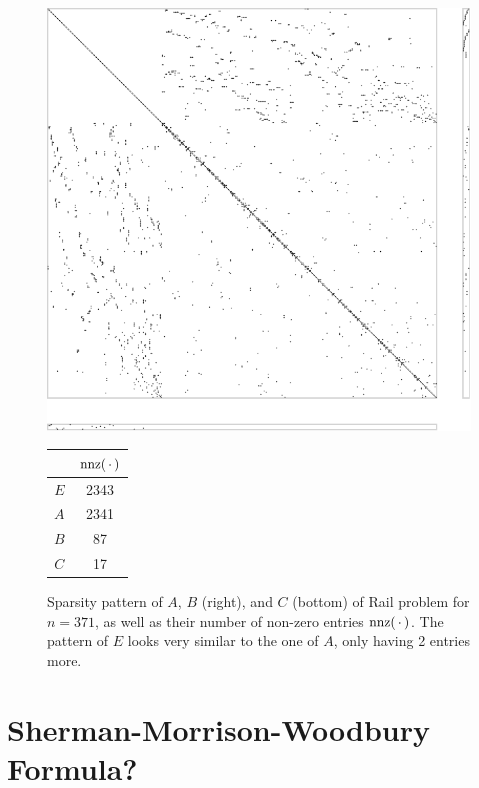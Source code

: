 \begin{figure}[t]
  \centering
  \begin{minipage}[c]{0.5\textwidth}
    \includegraphics[width=\textwidth]{figures/spy_ABC.pdf}
  \end{minipage}
  \begin{minipage}[c]{0.25\textwidth}
    \flushright
    \begin{tabular}{cS[table-format=4.0]}
      \toprule
      & {$\nnz(\optional{})$} \\
      \midrule
      $E$ & 2343 \\
      $A$ & 2341 \\
      $B$ & 87 \\
      $C$ & 17 \\
      \bottomrule
    \end{tabular}
  \end{minipage}
  \caption[Sparsity pattern of Rail problem]{%
    Sparsity pattern of $A$, $B$ (right), and $C$ (bottom) of Rail problem for $n=371$,
    as well as their number of non-zero entries $\nnz(\optional{})$.
    The pattern of $E$ looks very similar to the one of $A$, only having 2 entries more.
  }
  \label{fig:spy}
\end{figure}

\section{Sherman-Morrison-Woodbury Formula?}

